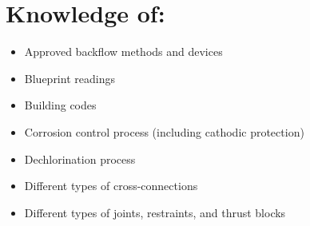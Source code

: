 \documentclass[10pt]{article}
\begin{document}
\section{Knowledge of:}
\begin{itemize}
  \item Approved backflow methods and devices

  \item Blueprint readings

  \item Building codes

  \item Corrosion control process (including cathodic protection)

  \item Dechlorination process

  \item Different types of cross-connections

  \item Different types of joints, restraints, and thrust blocks

\end{itemize}
\end{document}
